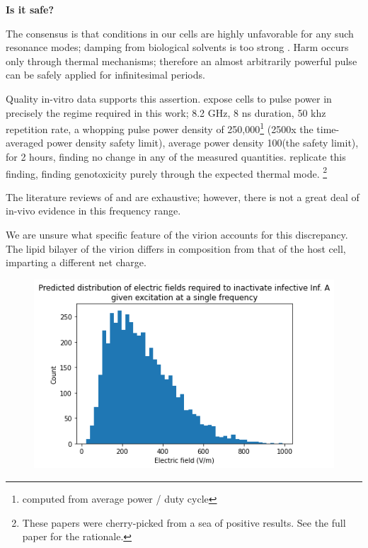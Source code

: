 \documentclass[fleqn,10pt]{paper}
\begin{document}
{\Large \textbf{Is it safe?}}

The consensus is that conditions in our cells are highly unfavorable for any such resonance modes; damping from biological solvents is too strong \cite{Vibrational2002}. Harm occurs only through thermal mechanisms; therefore an almost arbitrarily powerful pulse can be safely applied for infinitesimal periods.

Quality in-vitro data supports this assertion. \cite{Cytogenetic2006} expose cells to pulse power in precisely the regime required in this work; 8.2 GHz, 8 ns duration, 50 khz repetition rate, a whopping pulse power density of 250,000\Wsqm\footnote{computed from average power / duty cycle} (2500x the time-averaged power density safety limit), average power density 100\Wsqm (the safety limit), for 2 hours, finding no change in any of the measured quantities. \cite{DNA2004} replicate this finding, finding genotoxicity purely through the expected thermal mode. \footnote{These papers were cherry-picked from a sea of positive results. See the full paper for the rationale.}

The literature reviews of \cite{ICNIRP2020} and \cite{C95} are exhaustive; however, there is not a great deal of in-vivo evidence in this frequency range\cite{New2019}\cite{Comprehensive2018}.

We are unsure what specific feature of the virion accounts for this discrepancy. The lipid bilayer of the virion differs in composition from that of the host cell, imparting a different net charge.



\clearpage

\begin{figure}[H]
	\centering
	\includegraphics[width=\textwidth]{biology/output_35_1.png}
\end{figure}



\printbibliography[heading=none, title={}]
\end{document}
